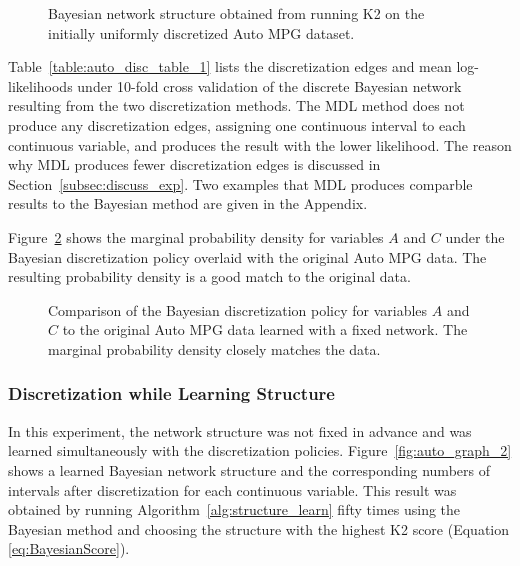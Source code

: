 \begin{figure}[ht]
  \centering
   
   \caption{Bayesian network structure obtained from running K2 on the initially uniformly discretized Auto MPG dataset.}
  \label{fig:auto_graph_1}
\end{figure}

Table~\ref{table:auto_disc_table_1} lists the discretization edges and mean log-likelihoods under \num{10}-fold cross validation of the discrete Bayesian network resulting from the two discretization methods.
The MDL method does not produce any discretization edges, assigning one continuous interval to each continuous variable, and produces the result with the lower likelihood.
The reason why MDL produces fewer discretization edges is discussed in Section~\ref{subsec:discuss_exp}.
Two examples that MDL produces comparble results to the Bayesian method are given in the Appendix.

\begin{table}[ht]
  \centering
  \caption{
    Discretization result of the Auto MPG dataset with fixed structure from Figure~\ref{fig:auto_graph_1}.
    The first five rows list the discretization edges and the last row lists the mean cross-validated log-likelihood; positive values are better.
  }
  
  \label{table:auto_disc_table_1}
\end{table}

Figure~\ref{fig:auto_exp1_distr_1_3} shows the marginal probability density for variables $A$ and $C$ under the Bayesian discretization policy overlaid with the original Auto MPG data.
The resulting probability density is a good match to the original data.

\begin{figure}[ht]
  \centering
  
  \caption{
    Comparison of the Bayesian discretization policy for variables $A$ and $C$ to the original Auto MPG data learned with a fixed network.
    The marginal probability density closely matches the data.
  }
  \label{fig:auto_exp1_distr_1_3}
\end{figure}

\subsubsection{Discretization while Learning Structure}
\label{subsubsec:auto_exp2}

In this experiment, the network structure was not fixed in advance and was learned simultaneously with the discretization policies.
Figure~\ref{fig:auto_graph_2} shows a learned Bayesian network structure and the corresponding numbers of intervals after discretization for each continuous variable.
This result was obtained by running Algorithm~\ref{alg:structure_learn} fifty times using the Bayesian method and choosing the structure with the highest K2 score (Equation \ref{eq:BayesianScore}).

